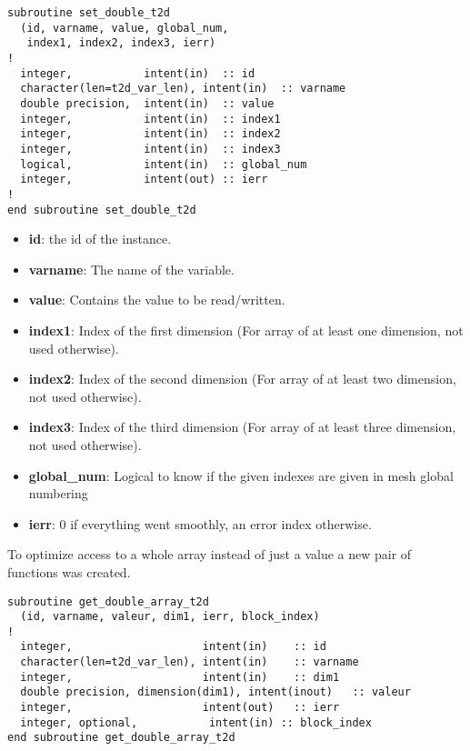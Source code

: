 \begin{itemize}
\begin{lstlisting}
subroutine set_double_t2d
  (id, varname, value, global_num,
   index1, index2, index3, ierr)
!
  integer,           intent(in)  :: id
  character(len=t2d_var_len), intent(in)  :: varname
  double precision,  intent(in)  :: value
  integer,           intent(in)  :: index1
  integer,           intent(in)  :: index2
  integer,           intent(in)  :: index3
  logical,           intent(in)  :: global_num
  integer,           intent(out) :: ierr
!
end subroutine set_double_t2d
\end{lstlisting}

\begin{itemize}
\item \textbf{id}: the id of the instance.
\item \textbf{varname}: The name of the variable.
\item \textbf{value}: Contains the value to be read/written.
\item \textbf{index1}: Index of the first dimension (For array of at least one
  dimension, not used otherwise).
\item \textbf{index2}: Index of the second dimension (For array of at least two
  dimension, not used otherwise).
\item \textbf{index3}: Index of the third dimension (For array of at least
  three dimension, not used otherwise).
\item \textbf{global\_num}: Logical to know if the given indexes are given in
  mesh global numbering
\item \textbf{ierr}: 0 if everything went smoothly, an error index otherwise.
\end{itemize}

\end{itemize}

To optimize access to a whole array instead of just a value a new pair of
functions was created.

\begin{lstlisting}
subroutine get_double_array_t2d
  (id, varname, valeur, dim1, ierr, block_index)
!
  integer,                    intent(in)    :: id
  character(len=t2d_var_len), intent(in)    :: varname
  integer,                    intent(in)    :: dim1
  double precision, dimension(dim1), intent(inout)   :: valeur
  integer,                    intent(out)   :: ierr
  integer, optional,           intent(in) :: block_index
end subroutine get_double_array_t2d

\end{lstlisting}

